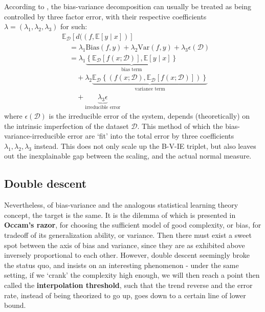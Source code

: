 \documentclass[
  journal=largetwo,
  year=2025,
  volume=37,
]{cup-journal}
\begin{document}
According to \cite{domingos_unified_aaai_2000,domingos_unified_2000}, the bias-variance decomposition can usually be treated as being controlled by three factor error, with their respective coefficients $\lambda=(\lambda_{1},\lambda_{2},\lambda_{3})$ for such: 
    \noindent 
    \begin{equation*}
        \begin{split}
            &\mathbb{E}_{\mathcal{D}} \left[d((f,\mathbb{E}[y\mid x])\right] \\
            & \quad = \lambda_{1} \mathrm{Bias}(f,y) + \lambda_{2}\mathrm{Var}(f,y)+ \lambda_{3}\epsilon(\mathcal{D})\\ 
            & \quad = \lambda_{1}\underbrace{\left\{ \mathbb{E}_{\mathcal{D}}[f(x;\mathcal{D})] , \mathbb{E}[y\mid x] \right\}}_{\text{bias term}} \\
            &\quad\quad +\lambda_{2} \underbrace{\mathbb{E}_{\mathcal{D}} \left\{(f(x;\mathcal{D}), \mathbb{E}_{\mathcal{D}}[f(x;\mathcal{D})])\right\}}_{\text{variance term}} \\
            &\quad\quad +\underbrace{\lambda_{3}\epsilon}_{\text{irreducible error}}
        \end{split}
        \end{equation*}
where $\epsilon(\mathcal{D})$ is the irreducible error of the system, depends (theoretically) on the intrinsic imperfection of the dataset $\mathcal{D}$. This method of which the bias-variance-irreducible error are `fit' into the total error by three coefficients $\lambda_{1},\lambda_{2},\lambda_{3}$ instead. This does not only scale up the B-V-IE triplet, but also leaves out the inexplainable gap between the scaling, and the actual normal measure. 

\subsection{Double descent}

Nevertheless, of bias-variance and the analogous statistical learning theory concept, the target is the same. It is the dilemma of which is presented in \textbf{Occam's razor}, for choosing the sufficient model of good complexity, or bias, for tradeoff of its generalization ability, or variance. Then there must exist a sweet spot between the axis of bias and variance, since they are as exhibited above inversely proportional to each other. However, double descent seemingly broke the status quo, and insists on an interesting phenomenon - under the same setting, if we `crank' the complexity high enough, we will then reach a point then called the \textbf{interpolation threshold}, such that the trend reverse and the error rate, instead of being theorized to go up, goes down to a certain line of lower bound. 
\end{document}
